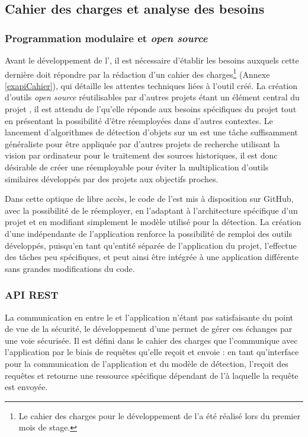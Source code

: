 \subsection{Cahier des charges et analyse des besoins}
    \subsubsection{Programmation modulaire et \textit{open source}}
    Avant le développement de l'\api, il est nécessaire d'établir les besoins auxquels cette dernière doit répondre par la rédaction d'un cahier des charges\footnote{Le cahier des charges pour le développement de l'\api a été réalisé lors du premier mois de stage.} (Annexe \ref{exapiCahier}), qui détaille les attentes techniques liées à l'outil créé. La création d'outils \textit{open source} réutilisables par d'autres projets étant un élément central du projet \eida, il est attendu de l'\api qu'elle réponde aux besoins spécifiques du projet tout en présentant la possibilité d'être réemployées dans d'autres contextes. Le lancement d'algorithmes de détection d'objets sur un \gpu est une tâche suffisamment généraliste pour être appliquée par d'autres projets de recherche utilisant la vision par ordinateur pour le traitement des sources historiques, il est donc désirable de créer une \api réemployable pour éviter la multiplication d'outils similaires développés par des projets aux objectifs proches.
    
    Dans cette optique de libre accès, le code de l'\api est mis à disposition sur GitHub, avec la possibilité de le réemployer, en l'adaptant à l'architecture spécifique d'un projet et en modifiant simplement le modèle utilisé pour la détection. La création d'une \api indépendante de l'application \eida renforce la possibilité de remploi des outils développés, puisqu'en tant qu'entité séparée de l'application du projet, l'\api effectue des tâches peu spécifiques, et peut ainsi être intégrée à une application différente sans grandes modifications du code. 
    
    \subsubsection{API REST}
    La communication en \ssh entre le \gpu et l’application \eida n’étant pas satisfaisante du point de vue de la sécurité, le développement d’une \api permet de gérer ces échanges par une voie sécurisée. Il est défini dans le cahier des charges que l'\api communique avec l'application par le biais de requêtes \http qu'elle reçoit et envoie : en tant qu'interface pour la communication de l'application et du modèle de détection, l'\api reçoit des requêtes \http et retourne une ressource spécifique dépendant de l'\URL à laquelle la requête est envoyée.
    
